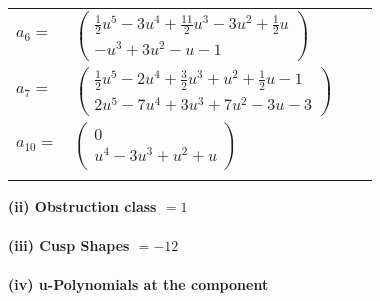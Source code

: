 \documentclass[1p]{elsarticle_modified}
\theoremstyle{definition}
\begin{document}
\begin{tabular}{m{7pt} m{180pt} m{7pt} m{180pt} }
\flushright $a_{6}=$&$\begin{pmatrix}\frac{1}{2} u^5-3 u^4+\frac{11}{2} u^3-3 u^2+\frac{1}{2} u\\- u^3+3 u^2- u-1\end{pmatrix}$ \\
\flushright $a_{7}=$&$\begin{pmatrix}\frac{1}{2} u^5-2 u^4+\frac{3}{2} u^3+u^2+\frac{1}{2} u-1\\2 u^5-7 u^4+3 u^3+7 u^2-3 u-3\end{pmatrix}$ \\
\flushright $a_{10}=$&$\begin{pmatrix}0\\u^4-3 u^3+u^2+u\end{pmatrix}$\\&\end{tabular}
\flushleft \textbf{(ii) Obstruction class $= 1$}\\~\\
\flushleft \textbf{(iii) Cusp Shapes $= -12$}\\~\\
\newpage\renewcommand{\arraystretch}{1}
\flushleft \textbf{(iv) u-Polynomials at the component}\newline \\
\end{document}
